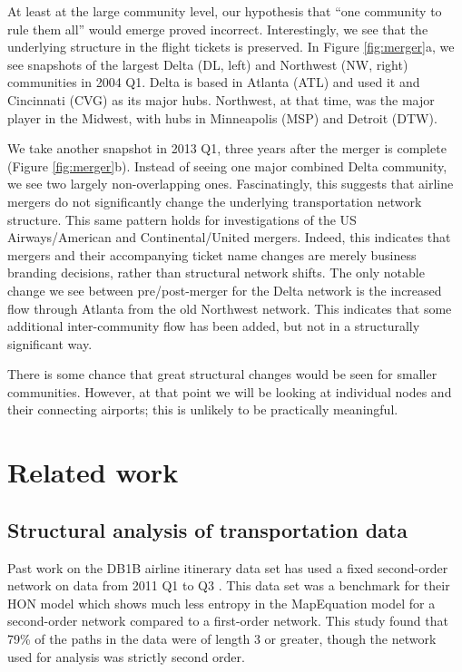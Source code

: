 \documentclass[sigconf]{acmart}
\begin{document}
At least at the large community level, our hypothesis that ``one community to rule them all'' would emerge proved incorrect. Interestingly, we see that the underlying structure in the flight tickets is preserved. In Figure \ref{fig:merger}a, we see snapshots of the largest Delta (DL, left) and Northwest (NW, right) communities in 2004 Q1. Delta is based in Atlanta (ATL) and used it and Cincinnati (CVG) as its major hubs. Northwest, at that time, was the major player in the Midwest, with hubs in Minneapolis (MSP) and Detroit (DTW).

We take another snapshot in 2013 Q1, three years after the merger is complete (Figure \ref{fig:merger}b). Instead of seeing one major combined Delta community, we see two largely non-overlapping ones. Fascinatingly, this suggests that airline mergers do not significantly change the underlying transportation network structure. This same pattern holds for investigations of the US Airways/American and Continental/United mergers. Indeed, this indicates that mergers and their accompanying ticket name changes are merely business branding decisions, rather than structural network shifts. The only notable change we see between pre/post-merger for the Delta network is the increased flow through Atlanta from the old Northwest network. This indicates that some additional inter-community flow has been added, but not in a structurally significant way.

There is some chance that great structural changes would be seen for smaller communities. However, at that point we will be looking at individual nodes and their connecting airports; this is unlikely to be practically meaningful.


\section{Related work}

\subsection{Structural analysis of transportation data}

Past work on the DB1B airline itinerary data set has used a fixed second-order network on data from 2011 Q1 to Q3 \cite{Rosvall2014}. This data set was a benchmark for their HON model which shows much less entropy in the MapEquation model for a second-order network compared to a first-order network. This study found that 79\% of the paths in the data were of length 3 or greater, though the network used for analysis was strictly second order. 
\end{document}

